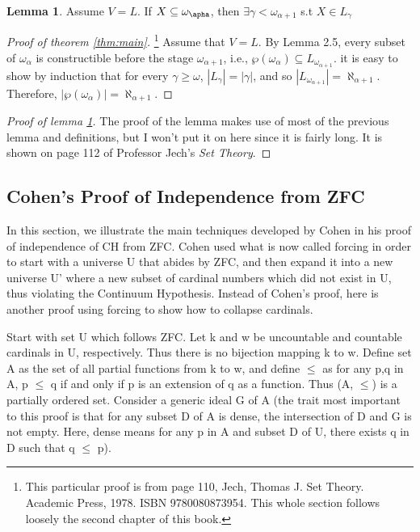 \documentclass[12pt]{article}
\theoremstyle{definition}
\newtheorem{lemma}{Lemma}[section]
\begin{document}
\begin{lemma}\label{lmm:main}
Assume $V=L$. If $X\subseteq \omega_\apha$, then $\exists \gamma < \omega_{\alpha +1}$ s.t $X\in L_\gamma$
\end{lemma}
\begin{proof}[Proof of theorem \ref{thm:main}]\footnote{This particular proof is from page 110, Jech, Thomas J. Set Theory. Academic Press, 1978. ISBN 9780080873954. This whole section follows loosely the second chapter of this book.}
Assume that $V=L$. By Lemma 2.5, every subset of $\omega_\alpha$ is constructible before the stage $\omega_{\alpha+1}$, i.e.,  $\wp(\omega_\alpha)\subseteq L_{\omega_{\alpha+1}}$. it is easy to show by induction that for every $\gamma \geq \omega$, $|L_\gamma|=|\gamma|$, and so $|L_{\omega_{\alpha+1}}|=\aleph_{\alpha+1}$. Therefore, $|\wp(\omega_\alpha)|=\aleph_{\alpha+1}$.
\end{proof}
\begin{proof}[Proof of lemma \ref{lmm:main}]
The proof of the lemma makes use of most of the previous lemma and definitions, but I won't put it on here since it is fairly long. It is shown on page 112 of Professor Jech's \textit{Set Theory}. 
\end{proof}
\subsection{Cohen's Proof of Independence from ZFC}
In this section, we illustrate the main techniques developed by Cohen in his proof of independence of CH from ZFC. Cohen used what is now called forcing in order to start with a universe U that abides by ZFC, and then expand it into a new universe U' where a new subset of cardinal numbers which did not exist in U, thus violating the Continuum Hypothesis. Instead of Cohen's proof, here is another proof using forcing to show how to collapse cardinals.

Start with set U which follows ZFC. Let k and w be uncountable and countable cardinals in U, respectively. Thus there is no bijection mapping k to w. Define set A as the set of all partial functions from k to w, and define $\leq$ as for any p,q in A, p $\leq$ q if and only if p is an extension of q as a function. Thus (A, $\leq$) is a partially ordered set. Consider a generic ideal G of A (the trait most important to this proof is that for any subset D of A is dense, the intersection of D and G is not empty. Here, dense means for any p in A and subset D of U, there exists q in D such that q $\leq$ p).
\end{document}

